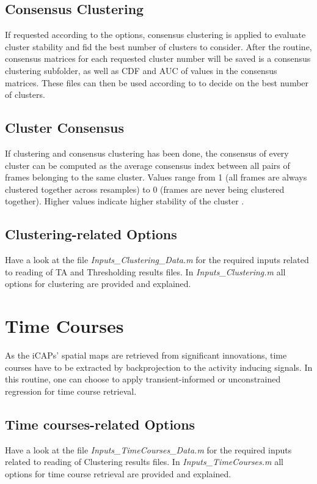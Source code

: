 \documentclass{article}
\begin{document}
\subsection{Consensus Clustering}
If requested according to the options, consensus clustering \cite{Monti2003} is applied to evaluate cluster stability and fid the best number of clusters to consider. After the routine, consensus matrices for each requested cluster number will be saved is a consensus clustering subfolder, as well as CDF and AUC of values in the consensus matrices. These files can then be used according to \cite{Monti2003} to decide on the best number of clusters.

\subsection{Cluster Consensus}
If clustering and consensus clustering has been done, the consensus of every cluster can be computed as the average consensus index between all pairs of frames belonging to the same cluster. Values range from 1 (all frames are always clustered together across resamples) to 0 (frames are never being clustered together). Higher values indicate higher stability of the cluster \cite{Monti2003}. 

\subsection{Clustering-related Options}
Have a look at the file \textit{Inputs\_Clustering\_Data.m} for the required inputs related to reading of TA and Thresholding results files. In \textit{Inputs\_Clustering.m} all options for clustering are provided and explained.


\section{Time Courses}
As the iCAPs' spatial maps are retrieved from significant innovations, time courses have to be extracted by backprojection to the activity inducing signals. In this routine, one can choose to apply transient-informed or unconstrained regression for time course retrieval.

\subsection{Time courses-related Options}
Have a look at the file \textit{Inputs\_TimeCourses\_Data.m} for the required inputs related to reading of Clustering results files. In \textit{Inputs\_TimeCourses.m} all options for time course retrieval are provided and explained.
\end{document}
